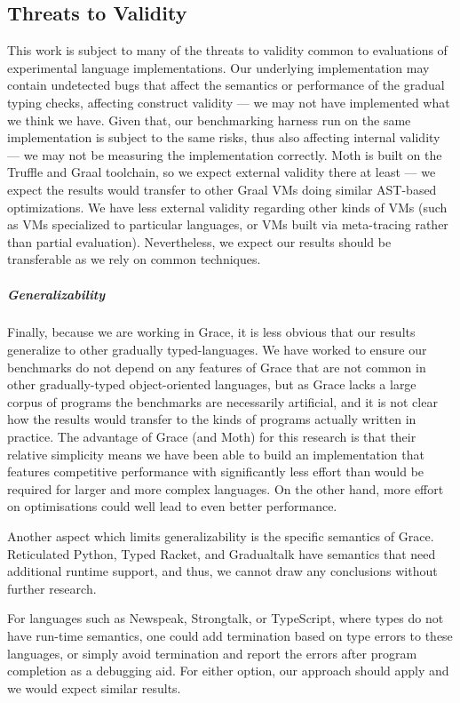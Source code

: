 \subsection{Threats to Validity}


This work is subject to many of the threats to validity common to
evaluations of experimental language implementations.  Our underlying
implementation may contain undetected bugs that affect the semantics
or performance of the gradual typing checks, affecting construct
validity --- we may not have implemented what we think we have. Given
that, our benchmarking harness run on the same implementation is
subject to the same risks, thus also affecting internal validity ---
we may not be measuring the implementation correctly.  Moth is built
on the Truffle and Graal toolchain, so we expect external validity
there at least --- we expect the results would transfer to other Graal
VMs doing similar AST-based optimizations.  We have less external
validity regarding other kinds of VMs (such as VMs specialized to 
particular languages, or VMs built via meta-tracing rather than partial evaluation). 
Nevertheless, we expect our results should be transferable
as we rely on common techniques.


\subparagraph{Generalizability}
Finally, because we are working in Grace, it is less obvious that our
results generalize to other gradually typed-languages. We have worked
to ensure \eg our benchmarks do not depend on any features of Grace
that are not common in other gradually-typed object-oriented
languages, but as Grace lacks a large corpus of programs the
benchmarks are necessarily artificial, and it is not clear how the
results would transfer to the kinds of programs actually written in
practice. The advantage of Grace (and Moth) for this research is
that their relative simplicity means we have been able to build an
implementation that features competitive performance with significantly less
effort than would be required for larger and more complex languages.
On the other hand, more effort on optimisations could well lead to
even better performance.

Another aspect which limits generalizability is the specific semantics of Grace.
Reticulated Python, Typed Racket, and Gradualtalk have semantics that need
additional runtime support, and thus, we cannot draw any conclusions without
further research.

For languages such as Newspeak, Strongtalk, or TypeScript,
where types do not have run-time semantics,
one could add termination based on type errors to these languages,
or simply avoid termination and report the errors after program completion
as a debugging aid.
For either option, our approach should apply and we would expect similar results.

